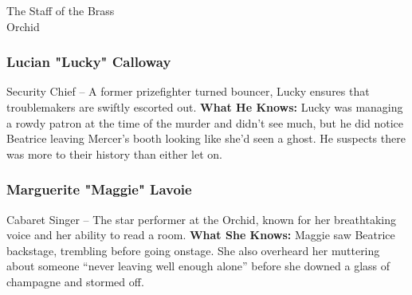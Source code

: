 \begin{NPC}[description=The people who keep the Orchid running]{The Staff of the Brass\\Orchid}
	\subsubsection*{Lucian "Lucky" Calloway}
	Security Chief – A former prizefighter turned bouncer, Lucky ensures that troublemakers are swiftly escorted out.
	\textbf{What He Knows:} Lucky was managing a rowdy patron at the time of the murder and didn't see much, but he did notice Beatrice leaving Mercer’s booth looking like she'd seen a ghost. He suspects there was more to their history than either let on.

	\subsubsection*{Marguerite "Maggie" Lavoie} 
	Cabaret Singer – The star performer at the Orchid, known for her breathtaking voice and her ability to read a room.
	\textbf{What She Knows:} Maggie saw Beatrice backstage, trembling before going onstage. She also overheard her muttering about someone “never leaving well enough alone” before she downed a glass of champagne and stormed off.
\end{NPC}
